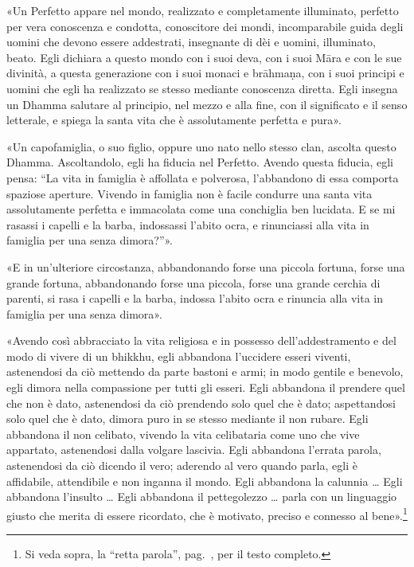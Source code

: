 «Un Perfetto appare nel mondo, realizzato e completamente illuminato, perfetto
per vera conoscenza e condotta, conoscitore dei mondi, incomparabile guida degli
uomini che devono essere addestrati, insegnante di dèi e uomini, illuminato,
beato. Egli dichiara a questo mondo con i suoi deva, con i suoi Māra e con le
sue divinità, a questa generazione con i suoi monaci e brāhmaṇa, con i suoi
principi e uomini che egli ha realizzato se stesso mediante conoscenza diretta.
Egli insegna un Dhamma salutare al principio, nel mezzo e alla fine, con il
significato e il senso letterale, e spiega la santa vita che è assolutamente
perfetta e pura».

«Un capofamiglia, o suo figlio, oppure uno nato nello stesso clan, ascolta
questo Dhamma. Ascoltandolo, egli ha fiducia nel Perfetto. Avendo questa
fiducia, egli pensa: “La vita in famiglia è affollata e polverosa, l’abbandono
di essa comporta spaziose aperture. Vivendo in famiglia non è facile condurre
una santa vita assolutamente perfetta e immacolata come una conchiglia ben
lucidata. E se mi rasassi i capelli e la barba, indossassi l’abito ocra, e
rinunciassi alla vita in famiglia per una senza dimora?”».

«E in un’ulteriore circostanza, abbandonando forse una piccola fortuna, forse
una grande fortuna, abbandonando forse una piccola, forse una grande cerchia di
parenti, si rasa i capelli e la barba, indossa l’abito ocra e rinuncia alla vita
in famiglia per una senza dimora».

«Avendo così abbracciato la vita religiosa e in possesso dell’addestramento e
del modo di vivere di un bhikkhu, egli abbandona l’uccidere esseri viventi,
astenendosi da ciò mettendo da parte bastoni e armi; in modo gentile e benevolo,
egli dimora nella compassione per tutti gli esseri. Egli abbandona il prendere
quel che non è dato, astenendosi da ciò prendendo solo quel che è dato;
aspettandosi solo quel che è dato, dimora puro in se stesso mediante il non
rubare. Egli abbandona il non celibato, vivendo la vita celibataria come uno che
vive appartato, astenendosi dalla volgare lascivia. Egli abbandona l’errata
parola, astenendosi da ciò dicendo il vero; aderendo al vero quando parla, egli
è affidabile, attendibile e non inganna il mondo. Egli abbandona la calunnia …
Egli abbandona l’insulto … Egli abbandona il pettegolezzo … parla con un
linguaggio giusto che merita di essere ricordato, che è motivato, preciso e
connesso al bene».\footnote{Si veda sopra, la “retta parola”,
  pag.~\pageref{pag265}, per il testo completo.}

